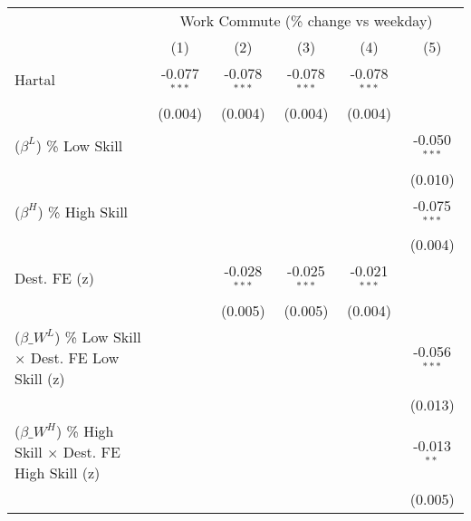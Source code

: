 {
\def\sym#1{\ifmmode^{#1}\else\(^{#1}\)\fi}
\begin{tabular}{l*{5}{c}}
\toprule
            &\multicolumn{5}{c}{Work Commute (\% change vs weekday)}                                                 \\\cmidrule(lr){2-6}
            &\multicolumn{1}{c}{(1)}        &\multicolumn{1}{c}{(2)}        &\multicolumn{1}{c}{(3)}        &\multicolumn{1}{c}{(4)}        &\multicolumn{1}{c}{(5)}        \\
\midrule
Hartal      &      -0.077$^{***}$&      -0.078$^{***}$&      -0.078$^{***}$&      -0.078$^{***}$&                    \\
            &     (0.004)        &     (0.004)        &     (0.004)        &     (0.004)        &                    \\
\addlinespace
\quad ($\beta^L$) \% Low Skill&                    &                    &                    &                    &      -0.050$^{***}$\\
            &                    &                    &                    &                    &     (0.010)        \\
\addlinespace
\quad ($\beta^H$) \% High Skill&                    &                    &                    &                    &      -0.075$^{***}$\\
            &                    &                    &                    &                    &     (0.004)        \\
\addlinespace
\quad Dest. FE (z) &                    &      -0.028$^{***}$&      -0.025$^{***}$&      -0.021$^{***}$&                    \\
            &                    &     (0.005)        &     (0.005)        &     (0.004)        &                    \\
\addlinespace
\quad ($\beta\_W^L$) \% Low Skill $\times$ Dest. FE Low Skill (z)&                    &                    &                    &                    &      -0.056$^{***}$\\
            &                    &                    &                    &                    &     (0.013)        \\
\addlinespace
\quad ($\beta\_W^H$) \% High Skill $\times$ Dest. FE High Skill (z)&                    &                    &                    &                    &      -0.013$^{**}$ \\
            &                    &                    &                    &                    &     (0.005)        \\

\end{tabular}}

